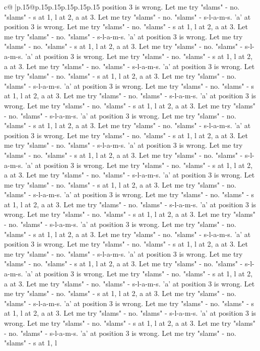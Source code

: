 \documentclass{article}
\begin{document}
{\begin{supertabular}{c@{$\;$}|p{.15\linewidth}@{}p{.15\linewidth}p{.15\linewidth}p{.15\linewidth}p{.15\linewidth}p{.15\linewidth}}
{{{position 3 is wrong. Let me try "slams" {-} no. "slams" {-} s at 1, l at 2, a at 3. Let me try "slams" {-} no. "slams" {-} s{-}l{-}a{-}m{-}s. 'a' at position 3 is wrong. Let me try "slams" {-} no. "slams" {-} s at 1, l at 2, a at 3. Let me try "slams" {-} no. "slams" {-} s{-}l{-}a{-}m{-}s. 'a' at position 3 is wrong. Let me try "slams" {-} no. "slams" {-} s at 1, l at 2, a at 3. Let me try "slams" {-} no. "slams" {-} s{-}l{-}a{-}m{-}s. 'a' at position 3 is wrong. Let me try "slams" {-} no. "slams" {-} s at 1, l at 2, a at 3. Let me try "slams" {-} no. "slams" {-} s{-}l{-}a{-}m{-}s. 'a' at position 3 is wrong. Let me try "slams" {-} no. "slams" {-} s at 1, l at 2, a at 3. Let me try "slams" {-} no. "slams" {-} s{-}l{-}a{-}m{-}s. 'a' at position 3 is wrong. Let me try "slams" {-} no. "slams" {-} s at 1, l at 2, a at 3. Let me try "slams" {-} no. "slams" {-} s{-}l{-}a{-}m{-}s. 'a' at position 3 is wrong. Let me try "slams" {-} no. "slams" {-} s at 1, l at 2, a at 3. Let me try "slams" {-} no. "slams" {-} s{-}l{-}a{-}m{-}s. 'a' at position 3 is wrong. Let me try "slams" {-} no. "slams" {-} s at 1, l at 2, a at 3. Let me try "slams" {-} no. "slams" {-} s{-}l{-}a{-}m{-}s. 'a' at position 3 is wrong. Let me try "slams" {-} no. "slams" {-} s at 1, l at 2, a at 3. Let me try "slams" {-} no. "slams" {-} s{-}l{-}a{-}m{-}s. 'a' at position 3 is wrong. Let me try "slams" {-} no. "slams" {-} s at 1, l at 2, a at 3. Let me try "slams" {-} no. "slams" {-} s{-}l{-}a{-}m{-}s. 'a' at position 3 is wrong. Let me try "slams" {-} no. "slams" {-} s at 1, l at 2, a at 3. Let me try "slams" {-} no. "slams" {-} s{-}l{-}a{-}m{-}s. 'a' at position 3 is wrong. Let me try "slams" {-} no. "slams" {-} s at 1, l at 2, a at 3. Let me try "slams" {-} no. "slams" {-} s{-}l{-}a{-}m{-}s. 'a' at position 3 is wrong. Let me try "slams" {-} no. "slams" {-} s at 1, l at 2, a at 3. Let me try "slams" {-} no. "slams" {-} s{-}l{-}a{-}m{-}s. 'a' at position 3 is wrong. Let me try "slams" {-} no. "slams" {-} s at 1, l at 2, a at 3. Let me try "slams" {-} no. "slams" {-} s{-}l{-}a{-}m{-}s. 'a' at position 3 is wrong. Let me try "slams" {-} no. "slams" {-} s at 1, l at 2, a at 3. Let me try "slams" {-} no. "slams" {-} s{-}l{-}a{-}m{-}s. 'a' at position 3 is wrong. Let me try "slams" {-} no. "slams" {-} s at 1, l at 2, a at 3. Let me try "slams" {-} no. "slams" {-} s{-}l{-}a{-}m{-}s. 'a' at position 3 is wrong. Let me try "slams" {-} no. "slams" {-} s at 1, l at 2, a at 3. Let me try "slams" {-} no. "slams" {-} s{-}l{-}a{-}m{-}s. 'a' at position 3 is wrong. Let me try "slams" {-} no. "slams" {-} s at 1, l at 2, a at 3. Let me try "slams" {-} no. "slams" {-} s{-}l{-}a{-}m{-}s. 'a' at position 3 is wrong. Let me try "slams" {-} no. "slams" {-} s at 1, l at 2, a at 3. Let me try "slams" {-} no. "slams" {-} s{-}l{-}a{-}m{-}s. 'a' at position 3 is wrong. Let me try "slams" {-} no. "slams" {-} s at 1, l at 2, a at 3. Let me try "slams" {-} no. "slams" {-} s{-}l{-}a{-}m{-}s. 'a' at position 3 is wrong. Let me try "slams" {-} no. "slams" {-} s at 1, l at 2, a at 3. Let me try "slams" {-} no. "slams" {-} s{-}l{-}a{-}m{-}s. 'a' at position 3 is wrong. Let me try "slams" {-} no. "slams" {-} s at 1, l }}}
\end{supertabular}}
\end{document}
